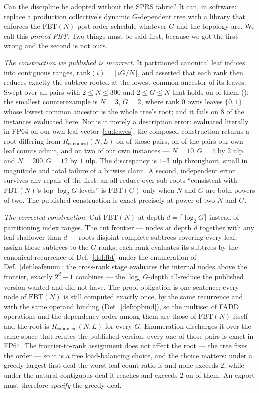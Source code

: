 \documentclass[journal,10pt]{IEEEtran}
\theoremstyle{plain}
\theoremstyle{definition}
\theoremstyle{remark}
\newcommand{\FBT}{\ensuremath{\mathrm{FBT}}}
\newcommand{\Rcan}{\ensuremath{R_{\mathrm{canonical}}}}
\newcommand{\sprs}{\textsc{SPRS}}
\begin{document}
Can the discipline be adopted without the \sprs{} fabric? It can, in software:
replace a production collective's dynamic $G$-dependent tree with a library
that enforces the $\FBT(N)$ post-order schedule whatever $G$ and the topology
are. We call this \emph{pinned-FBT}. Two things must be said first, because we
got the first wrong and the second is not ours.

\emph{The construction we published is incorrect.} It partitioned canonical
leaf indices into contiguous ranges, $\mathrm{rank}(i) = \lfloor iG/N \rfloor$,
and asserted that each rank then reduces exactly the subtree rooted at the
lowest common ancestor of its leaves. Swept over all \SweepPairs{} pairs with
$2 \le N \le 300$ and $2 \le G \le N$ that holds on \SweepStepOneHolds{} of
them (\SweepStepOnePct{}); the smallest counterexample is $N=3$, $G=2$, where
rank $0$ owns leaves $\{0,1\}$ whose lowest common ancestor is the whole
tree's root; and it fails on $8$ of the \SuiteSize{} instances evaluated here.
Nor is it merely a description error: evaluated literally in FP64 on our own
leaf vector~\eqref{eq:leaves}, the composed construction returns a root
differing from $\Rcan(N,L)$ on \PinIrMismatch{} of those pairs, on
\SweepRootDivergePct{} of the \PinSuitePairs{} pairs our own leaf counts
admit, and on two of our own instances --- $N=10, G=4$ by $2$ ulp and
$N=200, G=12$ by $1$ ulp. The discrepancy is $1$--$3{}$ ulp
throughout, small in magnitude and total failure of a bitwise claim. A second,
independent error survives any repair of the first: an all-reduce over
sub-roots ``consistent with $\FBT(N)$'s top $\log_2 G$ levels'' is $\FBT(G)$
only when $N$ and $G$ are both powers of two. The published construction is
exact precisely at power-of-two $N$ and $G$.

\emph{The corrected construction.} Cut $\FBT(N)$ at depth
$d = \lceil \log_2 G \rceil$ instead of partitioning index ranges. The cut
frontier --- nodes at depth $d$ together with any leaf shallower than $d$ ---
roots disjoint complete subtrees covering every leaf; assign those subtrees to
the $G$ ranks; each rank evaluates its subtrees by the canonical recurrence of
Def.~\ref{def:fbt} under the enumeration of Def.~\ref{def:leafenum}; the
cross-rank stage evaluates the internal nodes above the frontier, exactly
$2^{d}-1$ combines --- the $\log_2 G$-depth all-reduce the published version
wanted and did not have. The proof obligation is one sentence: every node of
$\FBT(N)$ is still computed exactly once, by the same recurrence and with the
same operand binding (Def.~\ref{def:opbind}), so the multiset of FADD
operations and the dependency order among them are those of $\FBT(N)$ itself
and the root is $\Rcan(N,L)$ for every $G$. Enumeration discharges it over the
same space that refutes the published version: every one of those
\SweepPairs{} pairs is exact in FP64. The frontier-to-rank assignment does not
affect the root --- the tree fixes the order --- so it is a free
load-balancing choice, and the choice matters: under a greedy largest-first
deal the worst leaf-count ratio is \PinImbLpt{} and none exceeds $2$, while
under the natural contiguous deal it reaches \PinImbContig{} and exceeds $2$
on \PinImbContigOver{} of them. An export must therefore \emph{specify} the
greedy deal.
\end{document}
